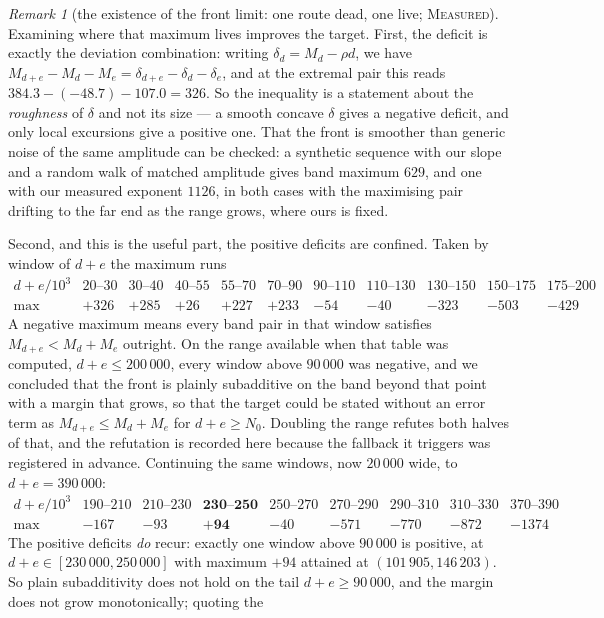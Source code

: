 \documentclass[11pt]{article}
\theoremstyle{definition}
\theoremstyle{remark}
\newtheorem{remark}[theorem]{Remark}
\newcommand{\MEASURED}{\textsc{Measured}}
\begin{document}
\begin{remark}[the existence of the front limit: one route dead, one live; \MEASURED]
Examining where that maximum lives improves the target. First, the deficit is exactly the deviation
combination: writing $\delta_d=M_d-\rho d$, we have $M_{d+e}-M_d-M_e=\delta_{d+e}-\delta_d-\delta_e$,
and at the extremal pair this reads $384.3-(-48.7)-107.0=326$. So the inequality is a statement about
the \emph{roughness} of $\delta$ and not its size --- a smooth concave $\delta$ gives a negative
deficit, and only local excursions give a positive one. That the front is smoother than generic noise
of the same amplitude can be checked: a synthetic sequence with our slope and a random walk of matched
amplitude gives band maximum $629$, and one with our measured exponent $1126$, in both cases with the
maximising pair drifting to the far end as the range grows, where ours is fixed.

Second, and this is the useful part, the positive deficits are confined. Taken by window of $d+e$ the
maximum runs
\[
\begin{array}{lrrrrrrrrrr}
d+e/10^{3} & 20\text{--}30 & 30\text{--}40 & 40\text{--}55 & 55\text{--}70 & 70\text{--}90 & 90\text{--}110 & 110\text{--}130 & 130\text{--}150 & 150\text{--}175 & 175\text{--}200\\
\max & +326 & +285 & +26 & +227 & +233 & -54 & -40 & -323 & -503 & -429
\end{array}
\]
A negative maximum means every band pair in that window satisfies $M_{d+e}<M_d+M_e$ outright. On the
range available when that table was computed, $d+e\le200\,000$, every window above $90\,000$ was
negative, and we concluded that the front is plainly subadditive on the band beyond that point with a
margin that grows, so that the target could be stated without an error term as $M_{d+e}\le M_d+M_e$ for
$d+e\ge N_0$. Doubling the range refutes both halves of that, and the refutation is recorded here
because the fallback it triggers was registered in advance. Continuing the same windows, now $20\,000$
wide, to $d+e=390\,000$:
\[
\begin{array}{lrrrrrrrr}
d+e/10^{3} & 190\text{--}210 & 210\text{--}230 & \mathbf{230\text{--}250} & 250\text{--}270 & 270\text{--}290 & 290\text{--}310 & 310\text{--}330 & 370\text{--}390\\
\max & -167 & -93 & \mathbf{+94} & -40 & -571 & -770 & -872 & -1374
\end{array}
\]
The positive deficits \emph{do} recur: exactly one window above $90\,000$ is positive, at
$d+e\in[230\,000,250\,000]$ with maximum $+94$ attained at $(101\,905,146\,203)$. So plain subadditivity
does not hold on the tail $d+e\ge90\,000$, and the margin does not grow monotonically; quoting the

\end{remark}
\end{document}
